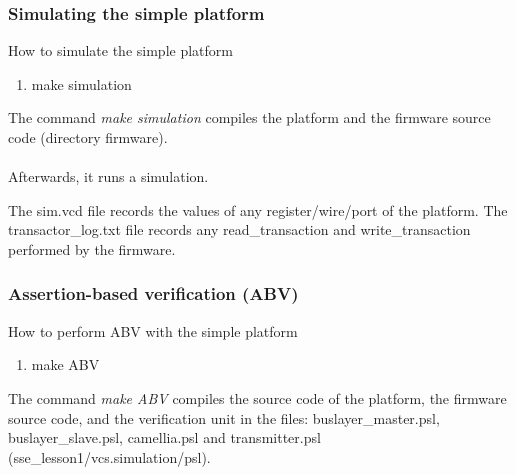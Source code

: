 \documentclass{beamer}
\begin{document}
\begin{frame}

\frametitle{Simulating the simple platform}

How to simulate the simple platform
\begin{block}{}
	\begin{enumerate}
		\item
		make simulation
	\end{enumerate}
\end{block}

The command \textit{make simulation} compiles the platform and the firmware 
source code (directory firmware).\\~\\ Afterwards, it runs a simulation.

The sim.vcd file records the values of any register/wire/port of the platform.
The transactor\_log.txt file records any read\_transaction and write\_transaction performed by the firmware. 

\end{frame}

\begin{frame}

\frametitle{Assertion-based verification (ABV)}

How to perform ABV with the simple platform
\begin{block}{}
	\begin{enumerate}
		\item
		make ABV
	\end{enumerate}
\end{block}

The command \textit{make ABV} compiles the source code of the platform,
the firmware source code, and the verification unit in the files:
buslayer\_master.psl, buslayer\_slave.psl, camellia.psl and transmitter.psl
(sse\_lesson1/vcs.simulation/psl).

\end{frame}
\end{document}
